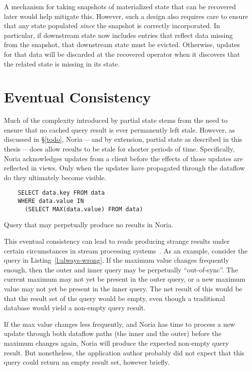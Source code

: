 A mechanism for taking snapshots of materialized state that can be recovered
later would help mitigate this. However, such a design also requires care to
ensure that any state populated \emph{since} the snapshot is correctly
incorporated. In particular, if downstream state now includes entries that
reflect data missing from the snapshot, that downstream state must be evicted.
Otherwise, updates for that data will be discarded at the recovered operator
when it discovers that the related state is missing in its state.

\section{Eventual Consistency}

Much of the complexity introduced by partial state stems from the need to ensure
that no cached query result is ever permanently left stale. However, as
discussed in \S\ref{todo}, Noria\,---\,and by extension, partial state as
described in this thesis\,---\,does allow results to be stale for shorter
periods of time. Specifically, Noria acknowledges updates from a client before
the effects of those updates are reflected in views. Only when the updates have
propagated through the dataflow do they ultimately become visible.

\begin{listing}[h]
  \begin{verbatim}
    SELECT data.key FROM data
    WHERE data.value IN
      (SELECT MAX(data.value) FROM data)
  \end{verbatim}
  \caption{Query that may perpetually produce no results in Noria.}
  \label{l:always-wrong}
\end{listing}

This eventual consistency can lead to reads producing strange results
under certain circumstances in stream processing
systems~\cite{materialize-eventual}. As an example, consider the query in
Listing~\ref{l:always-wrong}. If the maximum value changes frequently enough,
then the outer and inner query may be perpetually ``out-of-sync''. The current
maximum may not yet be present in the outer query, or a new maximum value may
not yet be present in the inner query. The net result of this would be that the
result set of the query would be empty, even though a traditional database would
yield a non-empty query result.

If the max value changes less frequently, and Noria has time to process a new
update through both dataflow paths (the inner and the outer) before the maximum
changes again, Noria will produce the expected non-empty query result. But
nonetheless, the application author probably did not expect that this query
could return an empty result set, however briefly.

